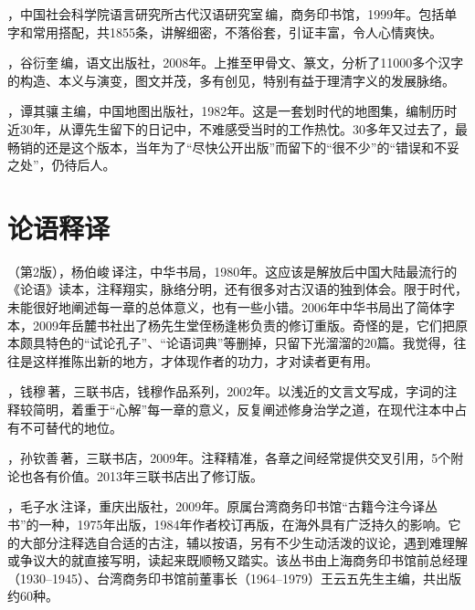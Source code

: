 ，中国社会科学院语言研究所古代汉语研究室\,编，商务印书馆，1999年。包括单字和常用搭配，共1855条，讲解细密，不落俗套，引证丰富，令人心情爽快。

，谷衍奎\,编，语文出版社，2008年。上推至甲骨文、篆文，分析了11000多个汉字的构造、本义与演变，图文并茂，多有创见，特别有益于理清字义的发展脉络。

，谭其骧\,主编，中国地图出版社，1982年。这是一套划时代的地图集，编制历时近30年，从谭先生留下的日记中，不难感受当时的工作热忱。30多年又过去了，最畅销的还是这个版本，当年为了“尽快公开出版”而留下的“很不少”的“错误和不妥之处”，仍待后人。


\lypdfbookmark\section*{论语释译}

（第2版），杨伯峻\,译注，中华书局，1980年。这应该是解放后中国大陆最流行的《论语》读本，注释翔实，脉络分明，还有很多对古汉语的独到体会。限于时代，未能很好地阐述每一章的总体意义，也有一些小错。2006年中华书局出了简体字本，2009年岳麓书社出了杨先生堂侄杨逢彬负责的修订重版。奇怪的是，它们把原本颇具特色的“试论孔子”、“论语词典”等删掉，只留下光溜溜的20篇。我觉得，往往是这样推陈出新的地方，才体现作者的功力，才对读者更有用。

，钱穆\,著，三联书店，钱穆作品系列，2002年。以浅近的文言文写成，字词的注释较简明，着重于“心解”每一章的意义，反复阐述修身治学之道，在现代注本中占有不可替代的地位。

，孙钦善\,著，三联书店，2009年。注释精准，各章之间经常提供交叉引用，5个附论也各有价值。2013年三联书店出了修订版。

，毛子水\,注译，重庆出版社，2009年。原属台湾商务印书馆“古籍今注今译丛书”的一种，1975年出版，1984年作者校订再版，在海外具有广泛持久的影响。它的大部分注释选自合适的古注，辅以按语，另有不少生动活泼的议论，遇到难理解或争议大的就直接写明，读起来既顺畅又踏实。该丛书由上海商务印书馆前总经理（1930--1945）、台湾商务印书馆前董事长（1964--1979）王云五先生主编，共出版约60种。

